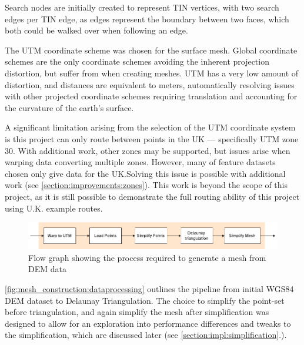\documentclass[12pt]{article}
\begin{document}
Search nodes are initially created to represent TIN vertices, with two search edges per TIN edge, as edges represent the boundary between two faces, which both could be walked over when following an edge. %

The UTM coordinate scheme was chosen for the surface mesh. Global coordinate schemes are the only coordinate schemes avoiding the inherent projection distortion, but suffer from %
when creating meshes. UTM has a very low amount of distortion, and distances are equivalent to meters, automatically resolving issues with other projected coordinate schemes requiring translation and accounting for the curvature of the earth's surface.

A significant limitation arising from the selection of the UTM coordinate system is this project can only route between points in the UK --- specifically UTM zone 30. With additional work, other zones may be supported, but issues arise when warping data converting multiple zones. However, many of feature datasets chosen only give data for the UK.\@ Solving this issue is possible with additional work (see \autoref{section:improvements:zones}). This work is beyond the scope of this project, as it is still possible to demonstrate the full routing ability of this project using U.K. example routes.

\begin{figure}[!htbp]
  \centering
  \includegraphics[width=1\textwidth]{assets/meshConstruction_zoomed.png}
  \caption{Flow graph showing the process required to generate a mesh from DEM data}\label{fig:mesh_construction:dataprocessing}
\end{figure}

\autoref{fig:mesh_construction:dataprocessing} outlines the pipeline from initial WGS84 DEM dataset to Delaunay Triangulation. The choice to simplify the point-set before triangulation, and again simplify the mesh after simplification was designed to allow for an exploration into performance differences and tweaks to the simplification, which are discussed later (see \autoref{section:impl:simplification}.).
\end{document}
